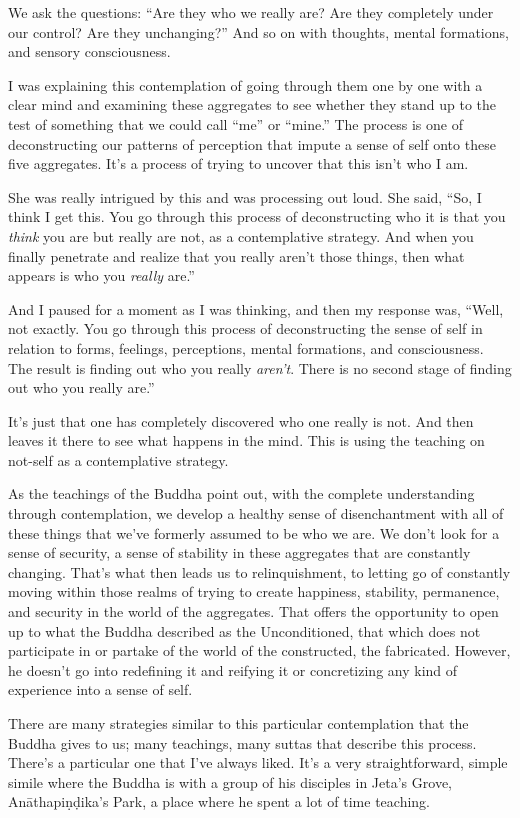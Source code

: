 We ask the questions: ``Are they who we really are? Are they completely under our control? Are they unchanging?'' And so on with thoughts, mental formations, and sensory consciousness.

I was explaining this contemplation of going through them one by one with a clear mind and examining these aggregates to see whether they stand up to the test of something that we could call ``me'' or ``mine.'' The process is one of deconstructing our patterns of perception that impute a sense of self onto these five aggregates. It's a process of trying to uncover that this isn't who I am.

She was really intrigued by this and was processing out loud. She said, ``So, I think I get this. You go through this process of deconstructing who it is that you \emph{think} you are but really are not, as a contemplative strategy. And when you finally penetrate and realize that you really aren't those things, then what appears is who you \emph{really} are.''

And I paused for a moment as I was thinking, and then my response was, ``Well, not exactly. You go through this process of deconstructing the sense of self in relation to forms, feelings, perceptions, mental formations, and consciousness. The result is finding out who you really \emph{aren't}. There is no second stage of finding out who you really are.''

It's just that one has completely discovered who one really is not. And then leaves it there to see what happens in the mind. This is using the teaching on not-self as a contemplative strategy.

As the teachings of the Buddha point out, with the complete understanding through contemplation, we develop a healthy sense of disenchantment with all of these things that we've formerly assumed to be who we are. We don't look for a sense of security, a sense of stability in these aggregates that are constantly changing. That's what then leads us to relinquishment, to letting go of constantly moving within those realms of trying to create happiness, stability, permanence, and security in the world of the aggregates. That offers the opportunity to open up to what the Buddha described as the Unconditioned, that which does not participate in or partake of the world of the constructed, the fabricated. However, he doesn't go into redefining it and reifying it or concretizing any kind of experience into a sense of self.

There are many strategies similar to this particular contemplation that the Buddha gives to us; many teachings, many suttas that describe this process. There's a particular one that I've always liked. It's a very straightforward, simple simile where the Buddha is with a group of his disciples in Jeta's Grove, Anāthapiṇḍika's Park, a place where he spent a lot of time teaching.


